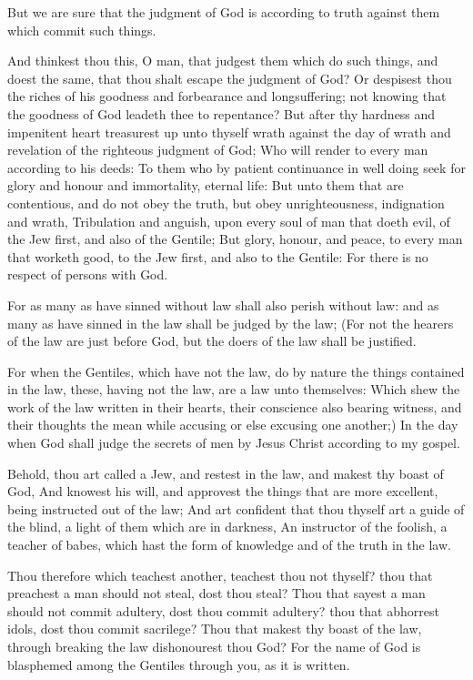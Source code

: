 \verse But we are sure that the judgment of God is according to truth against them which commit such things.

\verse And thinkest thou this, O man, that judgest them which do such things, and doest the same, that thou shalt escape the judgment of God?  \verse Or despisest thou the riches of his goodness and forbearance and longsuffering; not knowing that the goodness of God leadeth thee to repentance?  \verse But after thy hardness and impenitent heart treasurest up unto thyself wrath against the day of wrath and revelation of the righteous judgment of God; \verse Who will render to every man according to his deeds: \verse To them who by patient continuance in well doing seek for glory and honour and immortality, eternal life: \verse But unto them that are contentious, and do not obey the truth, but obey unrighteousness, indignation and wrath, \verse Tribulation and anguish, upon every soul of man that doeth evil, of the Jew first, and also of the Gentile; \verse But glory, honour, and peace, to every man that worketh good, to the Jew first, and also to the Gentile: \verse For there is no respect of persons with God.

\verse For as many as have sinned without law shall also perish without law: and as many as have sinned in the law shall be judged by the law; \verse (For not the hearers of the law are just before God, but the doers of the law shall be justified.

\verse For when the Gentiles, which have not the law, do by nature the things contained in the law, these, having not the law, are a law unto themselves: \verse Which shew the work of the law written in their hearts, their conscience also bearing witness, and their thoughts the mean while accusing or else excusing one another;) \verse In the day when God shall judge the secrets of men by Jesus Christ according to my gospel.

\verse Behold, thou art called a Jew, and restest in the law, and makest thy boast of God, \verse And knowest his will, and approvest the things that are more excellent, being instructed out of the law; \verse And art confident that thou thyself art a guide of the blind, a light of them which are in darkness, \verse An instructor of the foolish, a teacher of babes, which hast the form of knowledge and of the truth in the law.

\verse Thou therefore which teachest another, teachest thou not thyself?  thou that preachest a man should not steal, dost thou steal?  \verse Thou that sayest a man should not commit adultery, dost thou commit adultery? thou that abhorrest idols, dost thou commit sacrilege?  \verse Thou that makest thy boast of the law, through breaking the law dishonourest thou God?  \verse For the name of God is blasphemed among the Gentiles through you, as it is written.

